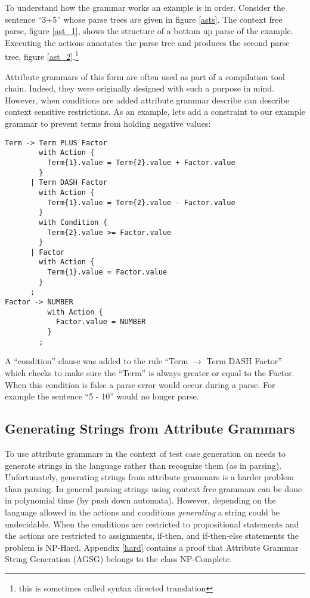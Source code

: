 To understand how the grammar works an example is in order. Consider the
sentence ``3+5'' whose parse trees are given in figure \ref{asts}. The context
free parse, figure \ref{ast_1}, shows the structure of a bottom up parse of the
example. Executing the actions annotates the parse tree and produces the second
parse tree, figure \ref{ast_2}.\footnote{this is sometimes called syntax
directed translation} 

Attribute grammars of this form are often used as part of a compilation tool
chain. Indeed, they were originally designed with such a purpose in mind.
However, when conditions are added attribute grammar describe can describe
context sensitive restrictions.\cite{Slonneger1995} As an example, lets add a
constraint to our example grammar to prevent terms from holding negative values:

\begin{verbatim}
Term -> Term PLUS Factor
        with Action {
          Term{1}.value = Term{2}.value + Factor.value
        }
      | Term DASH Factor
        with Action {
          Term{1}.value = Term{2}.value - Factor.value
        }
        with Condition {
          Term{2}.value >= Factor.value
        }
      | Factor
        with Action {
          Term{1}.value = Factor.value
        }
      ;
Factor -> NUMBER 
          with Action {
            Factor.value = NUMBER
          }
        ;
\end{verbatim}

\noindent
A ``condition'' clause was added to the rule ``Term $\rightarrow$ Term DASH
Factor'' which checks to make sure the ``Term'' is always greater or equal to
the Factor. When this condition is false a parse error would occur during a
parse. For example the sentence ``5 - 10'' would no longer parse.

\subsection{Generating Strings from Attribute Grammars}

To use attribute grammars in the context of test case generation on needs to
generate strings in the language rather than recognize them (as in parsing).
Unfortunately, generating strings from attribute grammars is a harder problem
than parsing. In general parsing strings using context free grammars can be done
in polynomial time (by push down automata).\cite{Aho2007} However, depending on
the language allowed in the actions and conditions \textit{generating} a string
could be undecidable. When the conditions are restricted to propositional
statements and the actions are restricted to assignments, if-then, and
if-then-else statements the problem is NP-Hard. Appendix \ref{hard} contains a
proof that Attribute Grammar String Generation (AGSG) belongs to the class
NP-Complete.

